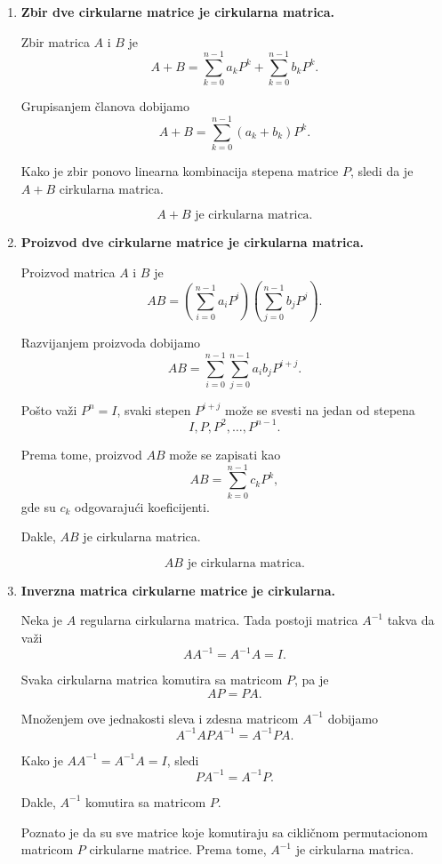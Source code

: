 \documentclass[12pt,a4paper]{report}
\begin{document}
\begin{enumerate}
	
	\item \textbf{Zbir dve cirkularne matrice je cirkularna matrica.}
	
	Zbir matrica $A$ i $B$ je
	\[
	A+B
	=
	\sum_{k=0}^{n-1}a_kP^k
	+
	\sum_{k=0}^{n-1}b_kP^k.
	\]
	
	Grupisanjem članova dobijamo
	\[
	A+B
	=
	\sum_{k=0}^{n-1}(a_k+b_k)P^k.
	\]
	
	Kako je zbir ponovo linearna kombinacija stepena matrice $P$,
	sledi da je $A+B$ cirkularna matrica.
	
	\[
	\boxed{A+B\text{ je cirkularna matrica.}}
	\]
	
	\item \textbf{Proizvod dve cirkularne matrice je cirkularna matrica.}
	
	Proizvod matrica $A$ i $B$ je
	\[
	AB
	=
	\left(\sum_{i=0}^{n-1}a_iP^i\right)
	\left(\sum_{j=0}^{n-1}b_jP^j\right).
	\]
	
	Razvijanjem proizvoda dobijamo
	\[
	AB
	=
	\sum_{i=0}^{n-1}\sum_{j=0}^{n-1}
	a_ib_jP^{i+j}.
	\]
	
	Pošto važi $P^n=I$, svaki stepen $P^{i+j}$ može se
	svesti na jedan od stepena
	\[
	I,P,P^2,\ldots,P^{n-1}.
	\]
	
	Prema tome, proizvod $AB$ može se zapisati kao
	\[
	AB=\sum_{k=0}^{n-1}c_kP^k,
	\]
	gde su $c_k$ odgovarajući koeficijenti.
	
	Dakle, $AB$ je cirkularna matrica.
	
	\[
	\boxed{AB\text{ je cirkularna matrica.}}
	\]
	
	\item \textbf{Inverzna matrica cirkularne matrice je cirkularna.}
	
	Neka je $A$ regularna cirkularna matrica. Tada postoji
	matrica $A^{-1}$ takva da važi
	\[
	AA^{-1}=A^{-1}A=I.
	\]
	
	Svaka cirkularna matrica komutira sa matricom $P$, pa je
	\[
	AP=PA.
	\]
	
	Množenjem ove jednakosti sleva i zdesna matricom $A^{-1}$
	dobijamo
	\[
	A^{-1}AP A^{-1}=A^{-1}PA.
	\]
	
	Kako je $AA^{-1}=A^{-1}A=I$, sledi
	\[
	PA^{-1}=A^{-1}P.
	\]
	
	Dakle, $A^{-1}$ komutira sa matricom $P$.
	
	Poznato je da su sve matrice koje komutiraju sa cikličnom
	permutacionom matricom $P$ cirkularne matrice. Prema tome,
	$A^{-1}$ je cirkularna matrica.
	

\end{enumerate}
\end{document}
